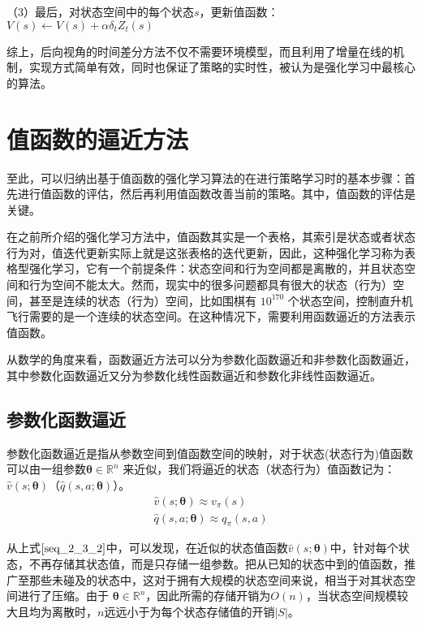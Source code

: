 （3）最后，对状态空间中的每个状态$s$，更新值函数：$V(s) \gets V(s)+\alpha \delta_{t} Z_{t}(s)$

综上，后向视角的时间差分方法不仅不需要环境模型，而且利用了增量在线的机制，实现方式简单有效，同时也保证了策略的实时性，被认为是强化学习中最核心的算法。

\section{值函数的逼近方法}
至此，可以归纳出基于值函数的强化学习算法的在进行策略学习时的基本步骤：首先进行值函数的评估，然后再利用值函数改善当前的策略。其中，值函数的评估是关键。

在之前所介绍的强化学习方法中，值函数其实是一个表格，其索引是状态或者状态行为对，值迭代更新实际上就是这张表格的迭代更新，因此，这种强化学习称为表格型强化学习，它有一个前提条件：状态空间和行为空间都是离散的，并且状态空间和行为空间不能太大。然而，现实中的很多问题都具有很大的状态（行为）空间，甚至是连续的状态（行为）空间，比如围棋有 $10^{170}$  个状态空间，控制直升机飞行需要的是一个连续的状态空间。在这种情况下，需要利用函数逼近的方法表示值函数。

从数学的角度来看，函数逼近方法可以分为参数化函数逼近和非参数化函数逼近，其中参数化函数逼近又分为参数化线性函数逼近和参数化非线性函数逼近。

\subsection{参数化函数逼近}
参数化函数逼近是指从参数空间到值函数空间的映射，对于状态(状态行为)值函数可以由一组参数$\bm{\theta}\in \mathbb{R}^{n} $ 来近似，我们将逼近的状态（状态行为）值函数记为：$\hat{v}(s;\bm{\theta})$（$\hat{q}(s,a;\bm{\theta})$）。
\begin{equation}
\label{seq_2_3_2}
\begin{aligned}
\hat{v}(s;\bm{\theta})\approx v_{\pi}(s)\\
\hat{q}(s,a;\bm{\theta})\approx q_{\pi}(s,a)
\end{aligned}
\end{equation}

从上式$\eqref{seq_2_3_2}$中，可以发现，在近似的状态值函数$\hat{v}(s;\bm{\theta})$中，针对每个状态，不再存储其状态值，而是只存储一组参数。把从已知的状态中到的值函数，推广至那些未碰及的状态中，这对于拥有大规模的状态空间来说，相当于对其状态空间进行了压缩。由于 $\bm{\theta}\in \mathbb{R}^{n}$，因此所需的存储开销为$O(n)$，当状态空间规模较大且均为离散时，$n$远远小于为每个状态存储值的开销$|S|$。

